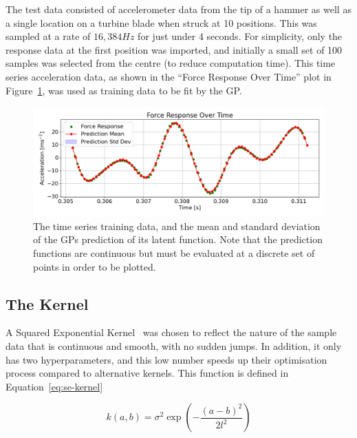 \documentclass[12pt]{article}
\begin{document}
    The test data consisted of accelerometer data from the tip of a hammer as well as a single location on a turbine blade when struck at 10 positions.
    This was sampled at a rate of $16,384 Hz$ for just under 4 seconds.
    For simplicity, only the response data at the first position was imported, and initially a small set of 100 samples was selected from the centre (to reduce computation time).
    This time series acceleration data, as shown in the ``Force Response Over Time'' plot in Figure~\ref{fig:input-response-plot}, was used as training data to be fit by the GP\@.

    \begin{figure}[ht]
        \centering
        \includegraphics[width=1.0\linewidth]{figures/input-response-plot/input-response-plot.png}
        \caption{The time series training data, and the mean and standard deviation of the GPs prediction of its latent function. Note that the prediction functions are continuous but must be evaluated at a discrete set of points in order to be plotted.}
        \label{fig:input-response-plot}
    \end{figure}



    \subsection{The Kernel}
    A Squared Exponential Kernel~\cite{duvenaud2014kernel} was chosen to reflect the nature of the sample data that is continuous and smooth, with no sudden jumps.
    In addition, it only has two hyperparameters, and this low number speeds up their optimisation process compared to alternative kernels.
    This function is defined in Equation~\ref{eq:se-kernel}

    \begin{equation}
        k(a,b) = \sigma^2 \exp\left(-\frac{(a - b)^2}{2l^2}\right) \label{eq:se-kernel}
    \end{equation}
\end{document}
